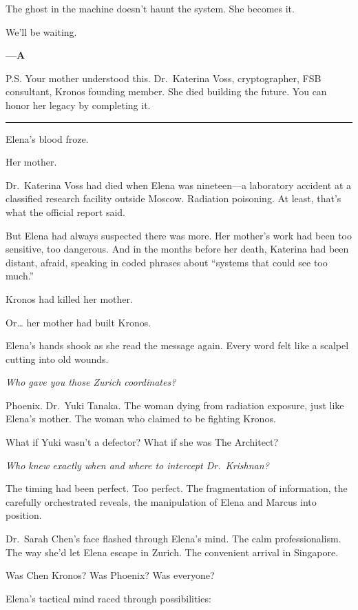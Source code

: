 The ghost in the machine doesn't haunt the system. She becomes it.

We'll be waiting.

\textbf{---A}

P.S. Your mother understood this. Dr.~Katerina Voss, cryptographer, FSB consultant, Kronos founding member. She died building the future. You can honor her legacy by completing it.

\begin{center}\rule{0.5\linewidth}{0.5pt}\end{center}

Elena's blood froze.

Her mother.

Dr.~Katerina Voss had died when Elena was nineteen---a laboratory accident at a classified research facility outside Moscow. Radiation poisoning. At least, that's what the official report said.

But Elena had always suspected there was more. Her mother's work had been too sensitive, too dangerous. And in the months before her death, Katerina had been distant, afraid, speaking in coded phrases about ``systems that could see too much.''

Kronos had killed her mother.

Or\ldots{} her mother had built Kronos.

Elena's hands shook as she read the message again. Every word felt like a scalpel cutting into old wounds.

\emph{Who gave you those Zurich coordinates?}

Phoenix. Dr.~Yuki Tanaka. The woman dying from radiation exposure, just like Elena's mother. The woman who claimed to be fighting Kronos.

What if Yuki wasn't a defector? What if she was The Architect?

\emph{Who knew exactly when and where to intercept Dr.~Krishnan?}

The timing had been perfect. Too perfect. The fragmentation of information, the carefully orchestrated reveals, the manipulation of Elena and Marcus into position.

Dr.~Sarah Chen's face flashed through Elena's mind. The calm professionalism. The way she'd let Elena escape in Zurich. The convenient arrival in Singapore.

Was Chen Kronos? Was Phoenix? Was everyone?

Elena's tactical mind raced through possibilities:

